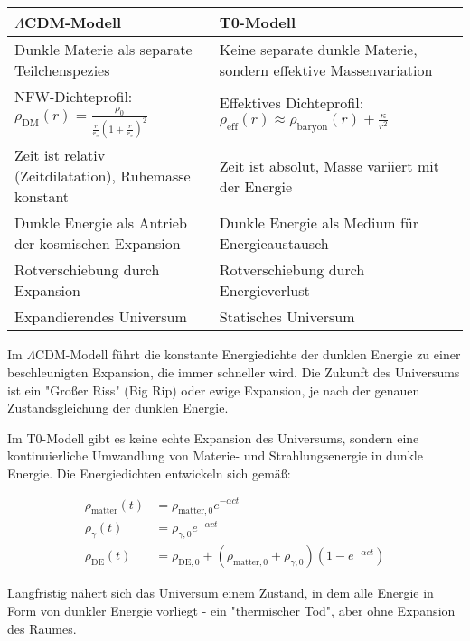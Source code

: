 \documentclass[a4paper,12pt]{article}
\theoremstyle{definition}
\theoremstyle{remark}
\begin{document}
	\begin{tcolorbox}[colback=yellow!5!white,colframe=yellow!75!black,title=Vergleich der Modelle]
		\begin{tabular}{p{}|p{}}
			\toprule
			\textbf{$\Lambda$CDM-Modell} & \textbf{T0-Modell} \\
			\midrule
			Dunkle Materie als separate Teilchenspezies & Keine separate dunkle Materie, sondern effektive Massenvariation \\
			\midrule
			NFW-Dichteprofil: $\rho_{\text{DM}}(r) = \frac{\rho_0}{\frac{r}{r_s}(1 + \frac{r}{r_s})^2}$ & Effektives Dichteprofil: $\rho_{\text{eff}}(r) \approx \rho_{\text{baryon}}(r) + \frac{\kappa}{r^2}$ \\
			\midrule
			Zeit ist relativ (Zeitdilatation), Ruhemasse konstant & Zeit ist absolut, Masse variiert mit der Energie \\
			\midrule
			Dunkle Energie als Antrieb der kosmischen Expansion & Dunkle Energie als Medium für Energieaustausch \\
			\midrule
			Rotverschiebung durch Expansion & Rotverschiebung durch Energieverlust \\
			\midrule
			Expandierendes Universum & Statisches Universum \\
			\bottomrule
		\end{tabular}
	\end{tcolorbox}
	
	Im $\Lambda$CDM-Modell führt die konstante Energiedichte der dunklen Energie zu einer beschleunigten Expansion, die immer schneller wird. Die Zukunft des Universums ist ein "Großer Riss" (Big Rip) oder ewige Expansion, je nach der genauen Zustandsgleichung der dunklen Energie.
	
	Im T0-Modell gibt es keine echte Expansion des Universums, sondern eine kontinuierliche Umwandlung von Materie- und Strahlungsenergie in dunkle Energie. Die Energiedichten entwickeln sich gemäß:
	
	\begin{align}
		\rho_{\text{matter}}(t) &= \rho_{\text{matter},0} e^{-\alpha c t} \\
		\rho_{\gamma}(t) &= \rho_{\gamma,0} e^{-\alpha c t} \\
		\rho_{\text{DE}}(t) &= \rho_{\text{DE},0} + (\rho_{\text{matter},0} + \rho_{\gamma,0})(1 - e^{-\alpha c t})
	\end{align}
	
	Langfristig nähert sich das Universum einem Zustand, in dem alle Energie in Form von dunkler Energie vorliegt - ein "thermischer Tod", aber ohne Expansion des Raumes.
\end{document}

